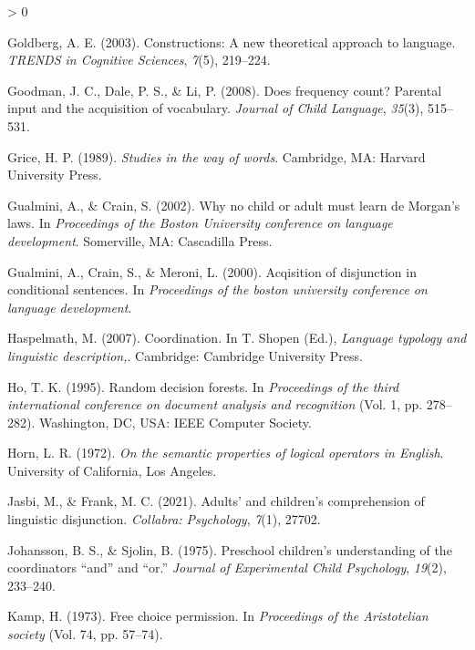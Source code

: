 \documentclass[
  english,
  ,man,floatsintext]{apa6}
\newlength{\cslhangindent}
\newenvironment{CSLReferences}[2] %
 {%
  \setlength{\parindent}{0pt}
  \ifodd #1 \everypar{\setlength{\hangindent}{\cslhangindent}}\ignorespaces\fi
  \ifnum #2 > 0
  \setlength{\parskip}{#2\baselineskip}
  \fi
 }%
 {}
\begin{document}
\begin{CSLReferences}{1}{0}
\leavevmode\hypertarget{ref-goldberg2010constructions}{}%
Goldberg, A. E. (2003). Constructions: A new theoretical approach to language. \emph{{TRENDS} in {C}ognitive {S}ciences}, \emph{7}(5), 219--224.

\leavevmode\hypertarget{ref-goodman2008does}{}%
Goodman, J. C., Dale, P. S., \& Li, P. (2008). Does frequency count? Parental input and the acquisition of vocabulary. \emph{Journal of Child Language}, \emph{35}(3), 515--531.

\leavevmode\hypertarget{ref-grice1989studies}{}%
Grice, H. P. (1989). \emph{Studies in the way of words}. Cambridge, MA: Harvard University Press.

\leavevmode\hypertarget{ref-gualminicrain2002}{}%
Gualmini, A., \& Crain, S. (2002). Why no child or adult must learn de {M}organ's laws. In \emph{Proceedings of the {B}oston {U}niversity conference on language development}. Somerville, MA: Cascadilla Press.

\leavevmode\hypertarget{ref-gualmini2000}{}%
Gualmini, A., Crain, S., \& Meroni, L. (2000). Acqisition of disjunction in conditional sentences. In \emph{Proceedings of the boston university conference on language development}.

\leavevmode\hypertarget{ref-haspelmath2007}{}%
Haspelmath, M. (2007). Coordination. In T. Shopen (Ed.), \emph{Language typology and linguistic description,}. Cambridge: Cambridge University Press.

\leavevmode\hypertarget{ref-ho1995random}{}%
Ho, T. K. (1995). Random decision forests. In \emph{Proceedings of the third international conference on document analysis and recognition} (Vol. 1, pp. 278--282). Washington, DC, USA: {IEEE} Computer Society.

\leavevmode\hypertarget{ref-horn1972semantic}{}%
Horn, L. R. (1972). \emph{On the semantic properties of logical operators in {E}nglish}. University of California, Los Angeles.

\leavevmode\hypertarget{ref-jasbi2021adults}{}%
Jasbi, M., \& Frank, M. C. (2021). Adults' and children's comprehension of linguistic disjunction. \emph{Collabra: Psychology}, \emph{7}(1), 27702.

\leavevmode\hypertarget{ref-johansson1975preschool}{}%
Johansson, B. S., \& Sjolin, B. (1975). Preschool children's understanding of the coordinators {``and''} and {``or.''} \emph{Journal of Experimental Child Psychology}, \emph{19}(2), 233--240.

\leavevmode\hypertarget{ref-kamp1973free}{}%
Kamp, H. (1973). Free choice permission. In \emph{Proceedings of the {A}ristotelian society} (Vol. 74, pp. 57--74).


\end{CSLReferences}
\end{document}
